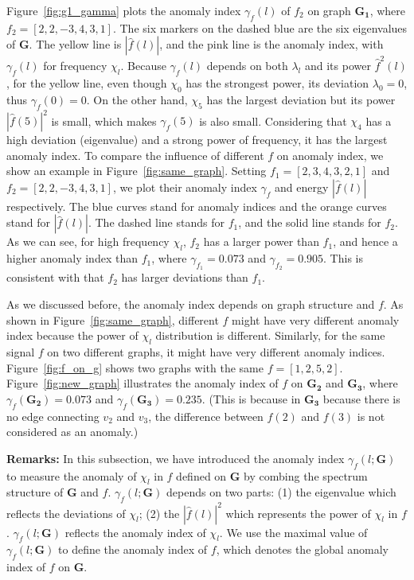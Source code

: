 Figure~\ref{fig:g1_gamma} plots the anomaly index $\gamma_f(l)$ of $f_2$ on graph $\mathbf{G_1}$, where $f_2=[2,2,-3,4,3,1]$. The six markers on the dashed blue are the six eigenvalues of $\mathbf{G}$. The yellow line is $|\hat{f}(l)|$, and the pink line is the anomaly index, with $\gamma_f(l)$ for frequency $\chi_l$. Because $\gamma_f(l)$ depends on both $\lambda_l$ and its power $\hat{f}^2(l)$, for the yellow line, even though $\chi_0$ has the strongest power, its deviation $\lambda_0 = 0$, thus $\gamma_f(0)=0$. On the other hand, $\chi_5$ has the largest deviation but its power $|\hat{f}(5)|^2$ is small, which makes $\gamma_f(5)$ is also small. Considering that $\chi_4$ has a high deviation (eigenvalue) and a strong power of frequency, it has the largest anomaly index. To compare the influence of different $f$ on anomaly index, we show an example in Figure~\ref{fig:same_graph}. Setting $f_1=[2,3,4,3,2,1]$ and $f_2=[2,2,-3,4,3,1]$, we plot their anomaly index $\gamma_{f}$ and energy $|\hat{f}(l)|$ respectively.
The blue curves stand for anomaly indices and the
orange curves stand for $|\hat{f}(l)|$. The dashed line stands for $f_1$, and the solid line stands for $f_2$. As we can see, for high frequency $\chi_l$, $f_2$ has a larger power than $f_1$, and hence a higher anomaly index than $f_1$, where $\gamma_{f_1}=0.073$ and $\gamma_{f_2}=0.905$. This is consistent with that $f_2$ has larger deviations than $f_1$.

As we discussed before, the anomaly index depends on graph structure and $f$. As shown in Figure~\ref{fig:same_graph}, different $f$ might have very different anomaly index because the power of $\chi_l$ distribution is different. Similarly, for the same signal $f$ on two different graphs, it might have very different anomaly indices. Figure~\ref{fig:f_on_g} shows two graphs with the same $f=[1,2,5,2]$. Figure~\ref{fig:new_graph} illustrates the anomaly index of $f$ on $\mathbf{G_2}$ and $\mathbf{G_3}$, where $\gamma_{f}(\mathbf{G_2})=0.073$ and $\gamma_{f}(\mathbf{G_3})=0.235$. (This is because in $\mathbf{G_3}$ because there is no edge connecting $v_2$ and $v_3$, the difference between $f(2)$ and $f(3)$ is not considered as an anomaly.)


{\textbf{Remarks:}}
In this subsection, we have introduced the anomaly index $\gamma_f(l;\mathbf{G})$ to measure the anomaly of $\chi_l$ in $f$ defined on $\mathbf{G}$ by combing the spectrum structure of $\mathbf{G}$ and $f$. $\gamma_f(l;\mathbf{G})$ depends on two parts: (1) the eigenvalue which reflects the deviations of $\chi_l$; (2) the $|\hat{f}(l)|^2$  which represents the power of $\chi_l$ in $f$. $\gamma_f(l;\mathbf{G})$ reflects the anomaly index of $\chi_l$. We use the maximal value of $\gamma_f(l;\mathbf{G})$ to define the anomaly index of $f$, which denotes the global anomaly index of $f$ on $\mathbf{G}$.



